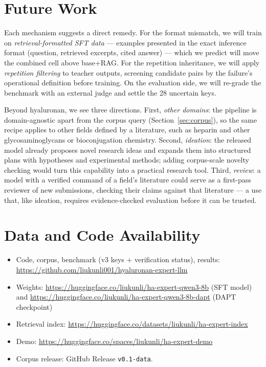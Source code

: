 \documentclass[11pt]{article}
\begin{document}
\section{Future Work}
\label{sec:future}

Each mechanism suggests a direct remedy. For the format mismatch, we
will train on \emph{retrieval-formatted SFT data} --- examples
presented in the exact inference format (question, retrieved excerpts,
cited answer) --- which we predict will move the combined cell above
base+RAG. For the repetition inheritance, we will apply
\emph{repetition filtering} to teacher outputs, screening candidate
pairs by the failure's operational definition before training. On the
evaluation side, we will re-grade the benchmark with an external judge
and settle the 28 uncertain keys.

Beyond hyaluronan, we see three directions. First, \emph{other
domains}: the pipeline is domain-agnostic apart from the corpus query
(Section~\ref{sec:corpus}), so the same recipe applies to other
fields defined by a literature, such as heparin and other
glycosaminoglycans or bioconjugation chemistry. Second,
\emph{ideation}: the released model already proposes novel research
ideas and expands them into structured plans with hypotheses and
experimental methods; adding corpus-scale novelty checking would
turn this capability into a practical research tool. Third,
\emph{review}: a model with a verified command of a field's
literature could serve as a first-pass reviewer of new submissions,
checking their claims against that literature --- a use that, like
ideation, requires evidence-checked evaluation before it can be
trusted.

\section{Data and Code Availability}
\label{sec:availability}

\begin{itemize}
\item Code, corpus, benchmark (v3 keys + verification status), results:
\url{https://github.com/liukunli001/hyaluronan-expert-llm}
\item Weights: \url{https://huggingface.co/liukunli/ha-expert-qwen3-8b}
(SFT model) and
\url{https://huggingface.co/liukunli/ha-expert-qwen3-8b-dapt} (DAPT
checkpoint)
\item Retrieval index:
\url{https://huggingface.co/datasets/liukunli/ha-expert-index}
\item Demo: \url{https://huggingface.co/spaces/liukunli/ha-expert-demo}
\item Corpus release: GitHub Release \texttt{v0.1-data}.
\end{itemize}
\end{document}

